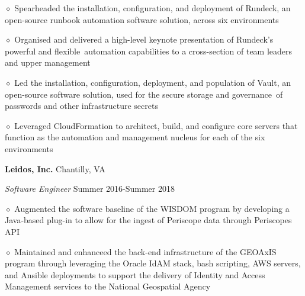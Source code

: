 \documentclass[executivepaper]{extarticle}
\begin{document}
\begin{center}
{\begin{minipage}{7.0in}
\vspace{0.25mm}

{\noindent $\diamond$ {\fontsize{12}{8}\selectfont Spearheaded the installation, configuration, and deployment of Rundeck, an open-source runbook automation software solution, across six environments}}

\vspace{0.25mm}

{\noindent $\diamond$ {\fontsize{12}{8}\selectfont Organised and delivered a high-level keynote presentation of Rundeck's powerful and flexible automation capabilities to a cross-section of team leaders and upper management}}

\vspace{0.25mm}

{\noindent $\diamond$ {\fontsize{12}{8}\selectfont Led the installation, configuration, deployment, and population of Vault, an open-source software solution, used for the secure storage and governance of passwords and other infrastructure secrets}}

\vspace{0.25mm}

{\noindent $\diamond$ {\fontsize{12}{8}\selectfont Leveraged CloudFormation to architect, build, and configure core servers that function as the automation and management nucleus for each of the six environments}}

\vspace{2mm}

{\noindent \textbf{\fontsize{12}{8}\selectfont Leidos, Inc.}} {\hfill \fontsize{10}{8}\selectfont Chantilly, VA}

\vspace{0.25mm}

{\noindent \textit{\fontsize{12}{8}\selectfont Software Engineer}} {\hfill \fontsize{10}{8}\selectfont Summer 2016-Summer 2018}

\vspace{0.25mm}

{\noindent $\diamond$ {\fontsize{12}{8}\selectfont Augmented the software baseline of the WISDOM program by developing a Java-based plug-in to allow for the ingest of Periscope data through Periscope\textsc{}s API}}

\vspace{0.25mm}

{\noindent $\diamond$ {\fontsize{12}{8}\selectfont Maintained and enhanceed the back-end infrastructure of the GEOAxIS program through leveraging the Oracle IdAM stack, bash scripting, AWS servers, and Ansible deployments to support the delivery of Identity and Access Management services to the National Geospatial Agency}}


\end{minipage}}
\end{center}
\end{document}
